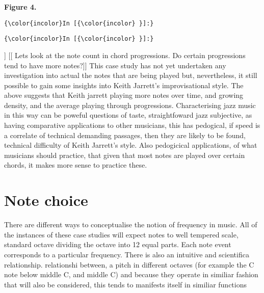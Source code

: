 \documentclass[11pt]{article}
\begin{document}
\noindent
\textbf{Figure 4.}
\\
    \begin{Verbatim}[commandchars=\\\{\}]
{\color{incolor}In [{\color{incolor} }]:} 
\end{Verbatim}

    \begin{Verbatim}[commandchars=\\\{\}]
{\color{incolor}In [{\color{incolor} }]:} 
\end{Verbatim}
\vspace{5mm} 
\noindent
[[ As well as relationship between tempo, what about chord, more notes played over dom chords?]]
[[ Lets look at the note count in chord progressions. Do certain progressions tend to have more notes?]]
This case study has not yet undertaken any investigation into actual the notes that are being played but, nevertheless, it still possible to gain some insights into Keith Jarrett's improvisational style. The above suggests that Keith jarrett playing more notes over time, and growing density, and the average playing through progressions. Characterising jazz music in this way can be poweful questions of taste, straightfoward jazz subjective, as having comparative applications to other musicians, this has pedogical, if speed is a correlate of technical demanding passages, then they are likely to be found, technical difficulty of Keith Jarrett's style. Also pedogicical applications, of what musicians should practice, that given that most notes are played over certain chords, it makes more sense to practice these.
\\


\section{Note choice}

\noindent
There are different ways to conceptualise the notion of frequency in music. All of the instances of these case studies will expect notes to well tempered scale, standard octave dividing the octave into 12 equal parts. Each note event corresponds to a particular frequency. There is also an intuitive and scientifica relationship. relationshi between, a pitch in different octaves (for example the C note below middle C, and middle C) and because they operate in similiar fashion that will also be considered, this tends to manifests itself in similiar functions
\\
\end{document}
